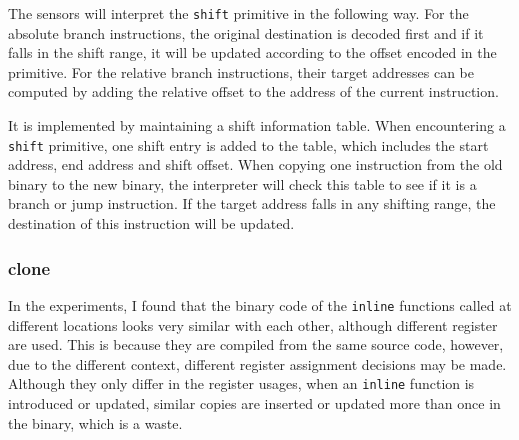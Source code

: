 The sensors will interpret the {\tt shift} primitive in the following way. 
For the absolute branch instructions, the original destination is decoded
first and if it falls in the shift range, it will be updated according
to the offset encoded in the primitive.
For the relative branch instructions, their target addresses can be computed by adding the relative offset to the address of the current instruction.

It is implemented by maintaining a shift information table. When encountering a {\tt shift} primitive,
one shift entry is added to the table, which includes the start address, end address and shift offset.
When copying one instruction from the old binary to the new binary, the interpreter will check this table to see if it is a branch or jump instruction. If the target address falls in any shifting range, the destination of this instruction will be updated.
%        

\subsubsection {clone}
In the experiments, I found that the binary code of the {\tt inline} functions called at different locations looks very similar with each other, although different register are used. This is because they are compiled from the same source code, however, due to the different context, different register assignment decisions may be made. Although they only differ in the register usages, when an {\tt inline} function is introduced or updated, similar copies are inserted or updated more than once in the binary, which is a waste.


